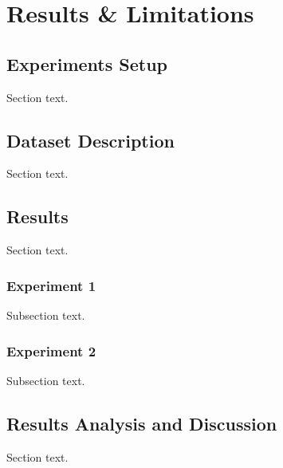 \chapter{Results \& Limitations}
\label{chap:result}
\section{Experiments Setup}
Section text.

\section{Dataset Description}
Section text.

\section{Results}
Section text.
\subsection{Experiment 1}
Subsection text. 

\subsection{Experiment 2}
Subsection text.

\section{Results Analysis and Discussion}
Section text.

